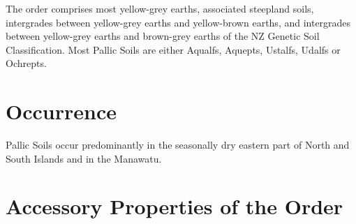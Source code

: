 \documentclass[
  letterpaper,
  DIV=11,
  numbers=noendperiod]{scrreprt}
\begin{document}
The order comprises most yellow-grey earths, associated steepland soils,
intergrades between yellow-grey earths and yellow-brown earths, and
intergrades between yellow-grey earths and brown-grey earths of the NZ
Genetic Soil Classification. Most Pallic Soils are either Aqualfs,
Aquepts, Ustalfs, Udalfs or Ochrepts.

\hypertarget{sec-occ-P}{%
\section{Occurrence}\label{sec-occ-P}}

Pallic Soils occur predominantly in the seasonally dry eastern part of
North and South Islands and in the Manawatu.

\hypertarget{sec-acc-P}{%
\section{Accessory Properties of the Order}\label{sec-acc-P}}
\end{document}
